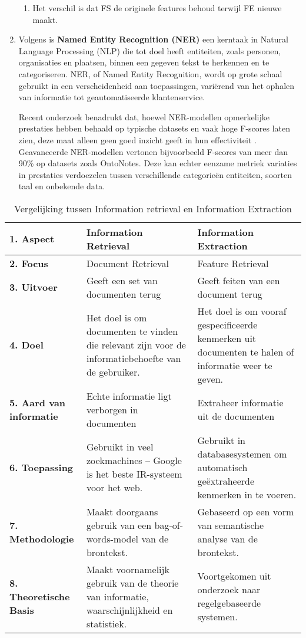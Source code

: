 \begin{enumerate}
\begin{enumerate}
        \item Het verschil is dat FS de originele features behoud terwijl FE nieuwe maakt.
    \end{enumerate}
    \item Volgens \textcite{vajjala2022reallyknowstateart} is \textbf{Named Entity Recognition (NER)} een kerntaak in Natural Language Processing (NLP) die tot doel heeft entiteiten, zoals personen, organisaties en plaatsen, binnen een gegeven tekst te herkennen en te categoriseren. NER, of Named Entity Recognition, wordt op grote schaal gebruikt in een verscheidenheid aan toepassingen, variërend van het ophalen van informatie tot geautomatiseerde klantenservice.
  
    Recent onderzoek benadrukt dat, hoewel NER-modellen opmerkelijke prestaties hebben behaald op typische datasets en vaak hoge F-scores laten zien, deze maat alleen geen goed inzicht geeft in hun effectiviteit \autocite{vajjala2022reallyknowstateart}. Geavanceerde NER-modellen vertonen bijvoorbeeld F-scores van meer dan 90\% op datasets zoals OntoNotes. Deze kan echter eenzame metriek variaties in prestaties verdoezelen tussen verschillende categorieën entiteiten, soorten taal en onbekende data.
\end{enumerate}


\begin{table}[h!]
    \centering
    \begin{tabular}{|p{4cm}|p{5cm}|p{5cm}|}
        \hline
        \textbf{1. Aspect} & \textbf{Information Retrieval} & \textbf{Information Extraction} \\ \hline
        \textbf{2. Focus} & Document Retrieval & Feature Retrieval \\ \hline
        \textbf{3. Uitvoer} & Geeft een set van documenten terug & Geeft feiten van een document terug \\ \hline
        \textbf{4. Doel} & Het doel is om documenten te vinden die relevant zijn voor de informatiebehoefte van de gebruiker. & Het doel is om vooraf gespecificeerde kenmerken uit documenten te halen of informatie weer te geven. \\ \hline
        \textbf{5. Aard van informatie} & Echte informatie ligt verborgen in documenten & Extraheer informatie uit de documenten \\ \hline
        \textbf{6. Toepassing} & Gebruikt in veel zoekmachines – Google is het beste IR-systeem voor het web. & Gebruikt in databasesystemen om automatisch geëxtraheerde kenmerken in te voeren. \\ \hline
        \textbf{7. Methodologie} & Maakt doorgaans gebruik van een bag-of-words-model van de brontekst. & Gebaseerd op een vorm van semantische analyse van de brontekst. \\ \hline
        \textbf{8. Theoretische Basis} & Maakt voornamelijk gebruik van de theorie van informatie, waarschijnlijkheid en statistiek. & Voortgekomen uit onderzoek naar regelgebaseerde systemen. \\ \hline
\end{tabular}
    \caption{Vergelijking tussen Information retrieval en Information Extraction}
    \label{tab:ir_versus_ie}
\end{table}

